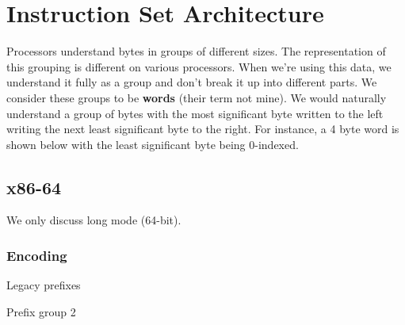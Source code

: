 \chapter{Instruction Set Architecture}

Processors understand bytes in groups of different sizes. The representation of
this grouping is different on various processors. When we're using this data, we
understand it fully as a group and don't break it up into different parts. We
consider these groups to be \textbf{words} (their term not mine). We would
naturally understand a group of bytes with the most significant byte written to
the left writing the next least significant byte to the right. For instance, a 4
byte word is shown below with the least significant byte being 0-indexed.

\begin{center}
\end{center}

\section{x86-64}

We only discuss long mode (64-bit).

\subsection{Encoding}

Legacy prefixes

Prefix group 2

